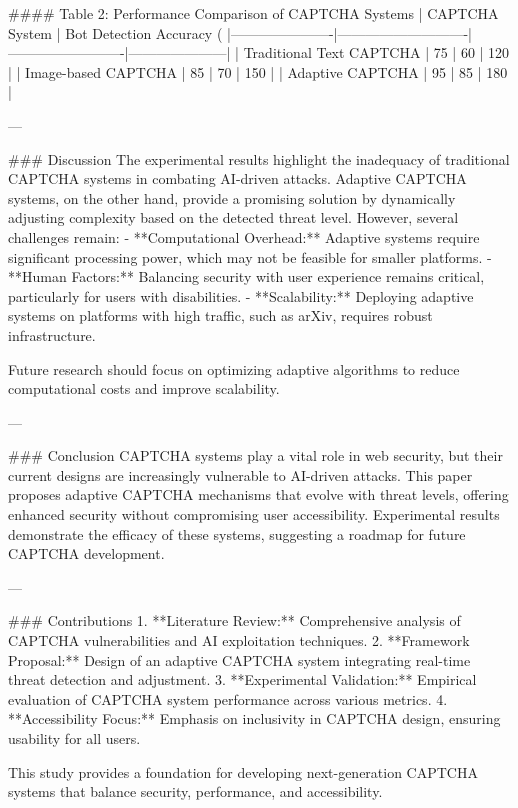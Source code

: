 #### Table 2: Performance Comparison of CAPTCHA Systems
| CAPTCHA System       | Bot Detection Accuracy (%
|----------------------|----------------------------|-------------------------|---------------------|
| Traditional Text CAPTCHA | 75                         | 60                      | 120                 |
| Image-based CAPTCHA  | 85                         | 70                      | 150                 |
| Adaptive CAPTCHA     | 95                         | 85                      | 180                 |

---

### Discussion
The experimental results highlight the inadequacy of traditional CAPTCHA systems in combating AI-driven attacks. Adaptive CAPTCHA systems, on the other hand, provide a promising solution by dynamically adjusting complexity based on the detected threat level. However, several challenges remain:
- **Computational Overhead:** Adaptive systems require significant processing power, which may not be feasible for smaller platforms.
- **Human Factors:** Balancing security with user experience remains critical, particularly for users with disabilities.
- **Scalability:** Deploying adaptive systems on platforms with high traffic, such as arXiv, requires robust infrastructure.

Future research should focus on optimizing adaptive algorithms to reduce computational costs and improve scalability.

---

### Conclusion
CAPTCHA systems play a vital role in web security, but their current designs are increasingly vulnerable to AI-driven attacks. This paper proposes adaptive CAPTCHA mechanisms that evolve with threat levels, offering enhanced security without compromising user accessibility. Experimental results demonstrate the efficacy of these systems, suggesting a roadmap for future CAPTCHA development.

---

### Contributions
1. **Literature Review:** Comprehensive analysis of CAPTCHA vulnerabilities and AI exploitation techniques.
2. **Framework Proposal:** Design of an adaptive CAPTCHA system integrating real-time threat detection and adjustment.
3. **Experimental Validation:** Empirical evaluation of CAPTCHA system performance across various metrics.
4. **Accessibility Focus:** Emphasis on inclusivity in CAPTCHA design, ensuring usability for all users.

This study provides a foundation for developing next-generation CAPTCHA systems that balance security, performance, and accessibility.